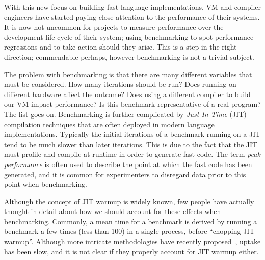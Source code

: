 \documentclass[10pt,preprint]{sigplanconf}
\begin{document}
With this new focus on building fast language implementations, VM and
compiler engineers have started paying close attention to the performance of
their systems. It is now not uncommon for projects to measure performance over
the development life-cycle of their system;  using benchmarking to spot
performance regressions and to take action should they arise. This is a step
in the right direction; commendable perhaps, however benchmarking is not a
trivial subject.

The problem with benchmarking is that there are many different variables that
must be considered. How many iterations should be run? Does running on
different hardware affect the outcome? Does using a different compiler to build
our VM impact performance? Is this benchmark representative of a real program?
The list goes on. Benchmarking is further complicated by \emph{Just In Time}
(JIT) compilation techniques that are often deployed in modern language
implementations. Typically the initial iterations of a benchmark running on a
JIT tend to be much slower than later iterations. This is due to the fact that
the JIT must profile and compile at runtime in order to generate fast code.
The term \emph{peak performance} is often used to describe the point at which
the fast code has been generated, and it is common for experimenters to
disregard data prior to this point when benchmarking.

Although the concept of JIT warmup is widely known, few people have actually
thought in detail about how we should account for these effects when
benchmarking. Commonly, a mean time for a benchmark is derived by running a
benchmark a few times (less than 100) in a single process, before ``chopping
JIT warmup''. Although more intricate methodologies have recently
proposed~\cite{XXX}, uptake has been slow, and it is not clear if they
properly account for JIT warmup either.
\end{document}

